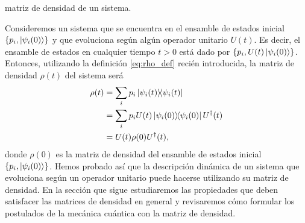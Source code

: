 matriz de densidad de un sistema.
% 
% 

Consideremos un sistema que se encuentra en el ensamble 
de estados inicial $\{ p_i, \ket{\psi_i(0)}\}$
y que evoluciona según algún operador unitario $U(t)$. Es decir, 
el ensamble de estados en cualquier tiempo $t>0$ está dado por 
$\{p_i, U(t)\ket{\psi_i(0)}\}$. Entonces, utilizando la definición 
\eqref{eq:rho_def} recién introducida, la matriz de
densidad $\rho(t)$ del sistema será
\begin{align} \label{eq:Rho-evolution-H}
	\rho(t) &= \sum_i p_i\dyad{\psi_i(t)}{\psi_i(t)}\nonumber\\
	&= \sum_i p_i U(t) \dyad{\psi_i(0)}{\psi_i(0)}U^{\dagger}(t)
	\nonumber\\
	&= U(t)\rho(0)U^{\dagger}(t),
\end{align}
donde $\rho(0)$ es la matriz de densidad del ensamble 
de estados inicial $\{p_i, \ket{\psi_i(0)}\}$. Hemos probado así
que la descripción dinámica de un sistema que evoluciona 
según un operador unitario puede hacerse utilizando 
su matriz de densidad. En la sección que sigue 
estudiaremos las propiedades que deben satisfacer 
las matrices de densidad en general y revisaremos cómo 
formular los postulados de la mecánica cuántica con la matriz de densidad.

